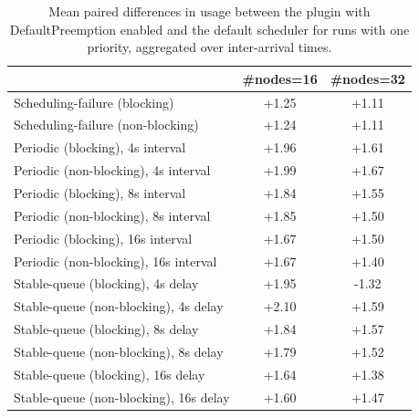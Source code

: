 \begin{table}[t]
\tiny
\setlength{\tabcolsep}{1.2pt}
\renewcommand{\arraystretch}{1.12}
\centering
\caption{Mean paired differences in usage between the plugin with DefaultPreemption enabled and the default scheduler for runs with one priority, aggregated over inter-arrival times.}
\label{tab:usage-defpreempt1-prio1-std0-agg-arrival}
\begin{tabular}{l c c}
\toprule
 & \#nodes=16 & \#nodes=32 \\
\midrule
Scheduling-failure (blocking) & +1.25 & +1.11 \\
Scheduling-failure (non-blocking) & +1.24 & +1.11 \\
Periodic (blocking), 4s interval & +1.96 & +1.61 \\
Periodic (non-blocking), 4s interval & +1.99 & +1.67 \\
Periodic (blocking), 8s interval & +1.84 & +1.55 \\
Periodic (non-blocking), 8s interval & +1.85 & +1.50 \\
Periodic (blocking), 16s interval & +1.67 & +1.50 \\
Periodic (non-blocking), 16s interval & +1.67 & +1.40 \\
Stable-queue (blocking), 4s delay & +1.95 & -1.32 \\
Stable-queue (non-blocking), 4s delay & +2.10 & +1.59 \\
Stable-queue (blocking), 8s delay & +1.84 & +1.57 \\
Stable-queue (non-blocking), 8s delay & +1.79 & +1.52 \\
Stable-queue (blocking), 16s delay & +1.64 & +1.38 \\
Stable-queue (non-blocking), 16s delay & +1.60 & +1.47 \\
\bottomrule
\end{tabular}
\end{table}
